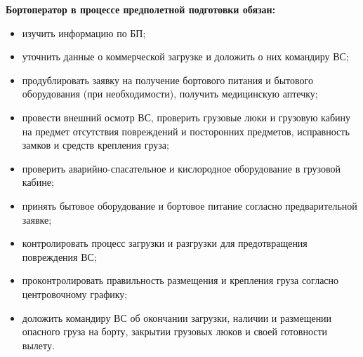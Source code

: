 \textbf{Бортоператор в процессе предполетной подготовки обязан:}
\begin{itemize}
    \item	изучить информацию по БП;
    \item	уточнить данные о коммерческой загрузке и доложить о них командиру ВС;
    \item	продублировать заявку на получение бортового питания и бытового оборудования (при необходимости), получить медицинскую аптечку;
    \item	провести внешний осмотр ВС, проверить грузовые люки и грузовую кабину на предмет отсутствия повреждений и посторонних предметов, исправность замков и средств крепления груза;
    \item	проверить аварийно-спасательное и кислородное оборудование в грузовой кабине;
    \item	принять бытовое оборудование и бортовое питание согласно предварительной заявке;
    \item	контролировать процесс загрузки и разгрузки для предотвращения повреждения ВС;
    \item	проконтролировать правильность размещения и крепления груза согласно центровочному графику;
    \item	доложить командиру ВС об окончании загрузки, наличии и размещении опасного груза на борту, закрытии грузовых люков и своей готовности вылету.
\end{itemize}

